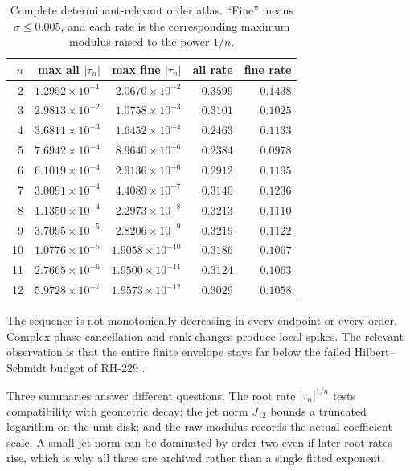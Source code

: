 \documentclass[11pt]{article}
\theoremstyle{remark}
\begin{document}
\begin{table}[ht]
\centering
\scriptsize
\begin{tabular}{rrrrr}
\toprule
$n$ & max all $|\tau_n|$ & max fine $|\tau_n|$
& all rate & fine rate\\
\midrule
2  & $1.2952\times10^{-1}$ & $2.0670\times10^{-2}$ & $0.3599$ & $0.1438$\\
3  & $2.9813\times10^{-2}$ & $1.0758\times10^{-3}$ & $0.3101$ & $0.1025$\\
4  & $3.6811\times10^{-3}$ & $1.6452\times10^{-4}$ & $0.2463$ & $0.1133$\\
5  & $7.6942\times10^{-4}$ & $8.9640\times10^{-6}$ & $0.2384$ & $0.0978$\\
6  & $6.1019\times10^{-4}$ & $2.9136\times10^{-6}$ & $0.2912$ & $0.1195$\\
7  & $3.0091\times10^{-4}$ & $4.4089\times10^{-7}$ & $0.3140$ & $0.1236$\\
8  & $1.1350\times10^{-4}$ & $2.2973\times10^{-8}$ & $0.3213$ & $0.1110$\\
9  & $3.7095\times10^{-5}$ & $2.8206\times10^{-9}$ & $0.3219$ & $0.1122$\\
10 & $1.0776\times10^{-5}$ & $1.9058\times10^{-10}$ & $0.3186$ & $0.1067$\\
11 & $2.7665\times10^{-6}$ & $1.9500\times10^{-11}$ & $0.3124$ & $0.1063$\\
12 & $5.9728\times10^{-7}$ & $1.9573\times10^{-12}$ & $0.3029$ & $0.1058$\\
\bottomrule
\end{tabular}
\caption{Complete determinant-relevant order atlas.  ``Fine'' means
$\sigma\le0.005$, and each rate is the corresponding maximum modulus raised
to the power $1/n$.}
\end{table}

The sequence is not monotonically decreasing in every endpoint or every
order.  Complex phase cancellation and rank changes produce local spikes.
The relevant observation is that the entire finite envelope stays far below
the failed Hilbert--Schmidt budget of RH-229 \citep{WangRH229,WangRH235}.

Three summaries answer different questions.  The root rate
$|\tau_n|^{1/n}$ tests compatibility with geometric decay; the jet norm
$J_{12}$ bounds a truncated logarithm on the unit disk; and the raw modulus
records the actual coefficient scale.  A small jet norm can be dominated by
order two even if later root rates rise, which is why all three are archived
rather than a single fitted exponent.
\end{document}
